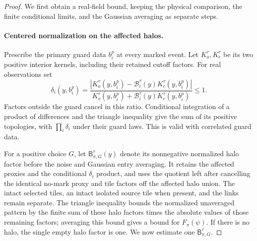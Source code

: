 \begin{proof}
We first obtain a real-field bound, keeping the physical comparison,
the finite conditional limits, and the Gaussian averaging as separate
steps.

\paragraph{Centered normalization on the affected halos.}
Prescribe the primary guard data \(b_i^p\) at every marked event.
Let \(K_o^\tau,K_c^\tau\) be its two positive interior kernels,
including their retained cutoff factors.  For real observations set
\[
 \delta_i(y,b_i^p)=
 \frac{|K_o^\tau(y,b_i^p)-\mathcal B_i^\tau(y)K_c^\tau(y,b_i^p)|}
      {K_o^\tau(y,b_i^p)+\mathcal B_i^\tau(y)K_c^\tau(y,b_i^p)}
                         \le1.
\]
Factors outside the guard cancel in this ratio.  Conditional
integration of a product of differences and the triangle inequality
give the sum of its positive topologies, with \(\prod_i\delta_i\)
under their guard laws.  This is valid with correlated guard data.

For a positive choice \(G\), let
\(\mathsf B_{\pi,G}^\tau(y)\) denote its nonnegative normalized halo
factor before the noise and Gaussian entry averaging.  It retains
the affected proxies and the conditional \(\delta_i\) product, and
uses the quotient left after cancelling the identical no-mark proxy
and tile factors off the affected halo union.  The intact selected
tiles, an intact isolated source tile when present, and the links
remain separate.  The triangle inequality bounds the normalized
unaveraged pattern by the finite sum of these halo factors times
the absolute values of those remaining factors; averaging this
bound gives a bound for \(F_\pi(\psi)\).  If there is no halo, the
single empty halo factor is one.  We now estimate one
\(\mathsf B_{\pi,G}^\tau\).


\end{proof}

